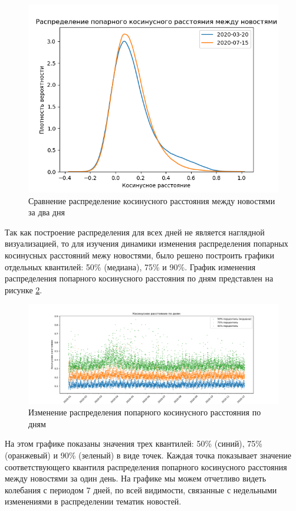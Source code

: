 \begin{figure}[h]
    \centering
    \includegraphics[width=\linewidth]{images/distances-distribution.png}
    \caption{Сравнение распределение косинусного расстояния между новостями за два дня}
    \label{img:distances-distribution}
\end{figure}

Так как построение распределения для всех дней не является наглядной визуализацией, то для изучения динамики изменения распределения попарных косинусных расстояний межу новостями, было решено построить графики отдельных квантилей: 50\% (медиана), 75\% и 90\%. График изменения распределения попарного косинусного расстояния по дням представлен на рисунке \ref{img:distances}.

\begin{figure}[h]
    \centering
    \includegraphics[width=\linewidth]{images/distances.png}
    \caption{Изменение распределения попарного косинусного расстояния по дням}
    \label{img:distances}
\end{figure}

На этом графике показаны значения трех квантилей: 50\% (синий), 75\% (оранжевый) и 90\% (зеленый) в виде точек. Каждая точка показывает значение соответствующего квантиля распределения попарного косинусного расстояния между новостями за один день. На графике мы  можем отчетливо видеть колебания с периодом 7 дней, по всей видимости, связанные с недельными изменениями в  распределении тематик новостей.

